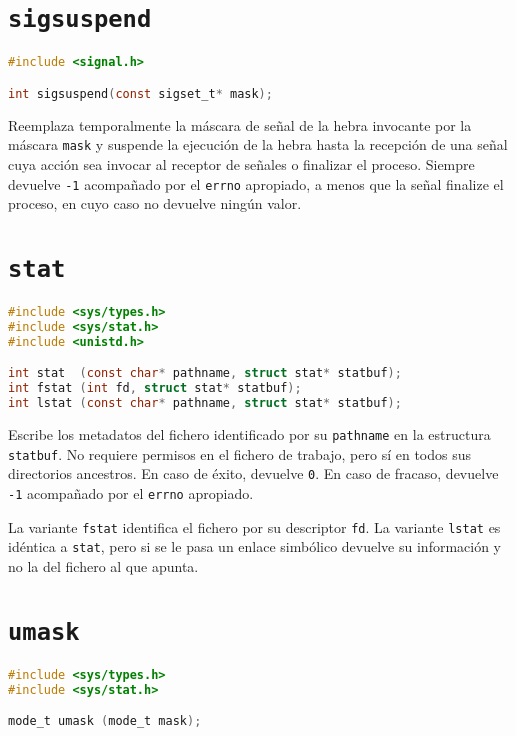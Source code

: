 \section{\texttt{sigsuspend}}\label{sigsuspend}

\begin{lstlisting}[language=C]
#include <signal.h>

int sigsuspend(const sigset_t* mask);
\end{lstlisting}

Reemplaza temporalmente la máscara de señal de la hebra invocante por la máscara \texttt{mask} y suspende la ejecución de la hebra hasta la recepción de una señal cuya acción sea invocar al receptor de señales o finalizar el proceso.
Siempre devuelve \texttt{-1} acompañado por el \texttt{errno} apropiado, a menos que la señal finalize el proceso, en cuyo caso no devuelve ningún valor.

\section{\texttt{stat}}\label{stat}

\begin{lstlisting}[language=C]
#include <sys/types.h>
#include <sys/stat.h>
#include <unistd.h>

int stat  (const char* pathname, struct stat* statbuf);
int fstat (int fd, struct stat* statbuf);
int lstat (const char* pathname, struct stat* statbuf);
\end{lstlisting}

Escribe los metadatos del fichero identificado por su \texttt{pathname} en la estructura \texttt{statbuf}.
No requiere permisos en el fichero de trabajo, pero sí en todos sus directorios ancestros.
En caso de éxito, devuelve \texttt{0}.
En caso de fracaso, devuelve \texttt{-1} acompañado por el \texttt{errno} apropiado.

La variante \texttt{fstat} identifica el fichero por su descriptor \texttt{fd}.
La variante \texttt{lstat} es idéntica a \texttt{stat}, pero si se le pasa un enlace simbólico devuelve su información y no la del fichero al que apunta.

\section{\texttt{umask}}\label{umask}

\begin{lstlisting}[language=C]
#include <sys/types.h>
#include <sys/stat.h>

mode_t umask (mode_t mask);
\end{lstlisting}

